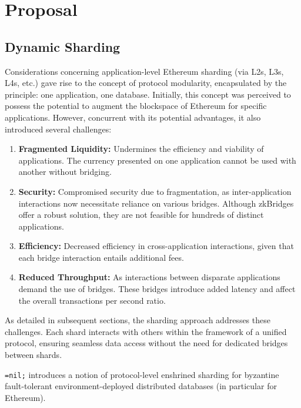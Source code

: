 \section{Proposal}
\label{section:proposal}

\subsection{Dynamic Sharding}
\label{section:sharding}

Considerations concerning application-level Ethereum sharding (via L2s, L3s, L4s, etc.) 
gave rise to the concept of protocol modularity, encapsulated by the principle: 
one application, one database. Initially, this concept was perceived to possess 
the potential to augment the blockspace of Ethereum for specific applications. 
However, concurrent with its potential advantages, it also introduced several 
challenges:
\begin{enumerate}
    \item \textbf{Fragmented Liquidity:} Undermines the efficiency and viability 
        of applications. The currency presented on one application cannot be used 
        with another without bridging.
    \item \textbf{Security:} Compromised security due to fragmentation, as 
        inter-application interactions now necessitate reliance on various bridges.
        Although zkBridges offer a robust solution, they are not feasible for 
        hundreds of distinct applications.
    \item \textbf{Efficiency:} Decreased efficiency in cross-application 
        interactions, given that each bridge interaction entails additional fees.
    \item \textbf{Reduced Throughput:} As interactions between disparate 
        applications demand the use of bridges. These bridges introduce added 
        latency and affect the overall transactions per second ratio.
\end{enumerate}

As detailed in subsequent sections, the sharding approach addresses these challenges. 
Each shard interacts with others within the framework of a unified protocol,
ensuring seamless data access without the need for dedicated bridges between shards.

\texttt{=nil;} introduces a notion of protocol-level enshrined sharding for 
byzantine fault-tolerant environment-deployed distributed databases (in particular 
for Ethereum). 

